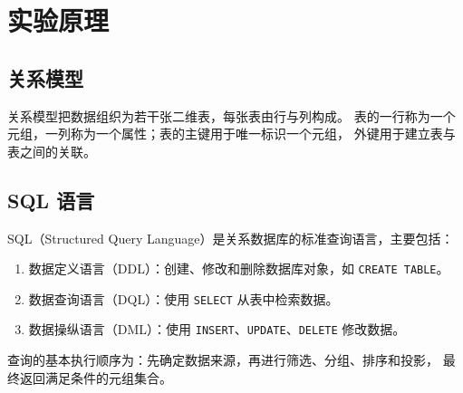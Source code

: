 \chapter{实验原理}

\section{关系模型}

关系模型把数据组织为若干张二维表，每张表由行与列构成。
表的一行称为一个元组，一列称为一个属性；表的主键用于唯一标识一个元组，
外键用于建立表与表之间的关联。

\section{SQL 语言}

SQL（Structured Query Language）是关系数据库的标准查询语言，主要包括：

\begin{enumerate}
  \item 数据定义语言（DDL）：创建、修改和删除数据库对象，如 \verb|CREATE TABLE|。
  \item 数据查询语言（DQL）：使用 \verb|SELECT| 从表中检索数据。
  \item 数据操纵语言（DML）：使用 \verb|INSERT|、\verb|UPDATE|、\verb|DELETE| 修改数据。
\end{enumerate}

查询的基本执行顺序为：先确定数据来源，再进行筛选、分组、排序和投影，
最终返回满足条件的元组集合。
